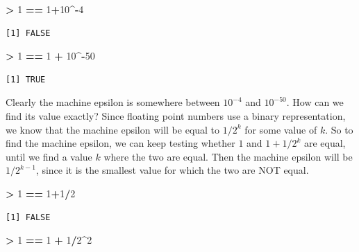 \documentclass[
]{krantz}
\makeatletter
\newenvironment{Shaded}{\begin{snugshade}}{\end{snugshade}}
\newcommand{\DecValTok}[1]{\textcolor[rgb]{0.06,0.06,0.06}{#1}}
\newcommand{\OperatorTok}[1]{\textcolor[rgb]{0.43,0.43,0.43}{\textbf{#1}}}
\newcommand{\StringTok}[1]{\textcolor[rgb]{0.5,0.5,0.5}{#1}}
\newenvironment{kframe}{%
\medskip{}
\setlength{\fboxsep}{.8em}
 \def\at@end@of@kframe{}%
 \ifinner\ifhmode%
  \def\at@end@of@kframe{\end{minipage}}%
  \begin{minipage}{\columnwidth}%
 \fi\fi%
 \def\FrameCommand##1{\hskip\@totalleftmargin \hskip-\fboxsep
 \colorbox{shadecolor}{##1}\hskip-\fboxsep
     \hskip-\linewidth \hskip-\@totalleftmargin \hskip\columnwidth}%
 \MakeFramed {\advance\hsize-\width
   \@totalleftmargin\z@ \linewidth\hsize
   \@setminipage}}%
 {\par\unskip\endMakeFramed%
 \at@end@of@kframe}
\renewenvironment{Shaded}{\begin{kframe}}{\end{kframe}}
\makeatother
\begin{document}
\begin{Shaded}
\begin{Highlighting}[]
\OperatorTok{\textgreater{}}\StringTok{ }\DecValTok{1} \OperatorTok{==}\StringTok{ }\DecValTok{1}\OperatorTok{+}\DecValTok{10}\OperatorTok{\^{}{-}}\DecValTok{4}
\end{Highlighting}
\end{Shaded}

\begin{verbatim}
[1] FALSE
\end{verbatim}

\begin{Shaded}
\begin{Highlighting}[]
\OperatorTok{\textgreater{}}\StringTok{ }\DecValTok{1} \OperatorTok{==}\StringTok{ }\DecValTok{1} \OperatorTok{+}\StringTok{ }\DecValTok{10}\OperatorTok{\^{}{-}}\DecValTok{50}
\end{Highlighting}
\end{Shaded}

\begin{verbatim}
[1] TRUE
\end{verbatim}

Clearly the machine epsilon is somewhere between \(10^{-4}\) and \(10^{-50}\). How can we find its value exactly? Since floating point numbers use a binary representation, we know that the machine epsilon will be equal to \(1/2^k\) for some value of \(k\). So to find the machine epsilon, we can keep testing whether \(1\) and \(1+1/2^k\) are equal, until we find a value \(k\) where the two are equal. Then the machine epsilon will be \(1/2^{k-1}\), since it is the smallest value for which the two are NOT equal.

\begin{Shaded}
\begin{Highlighting}[]
\OperatorTok{\textgreater{}}\StringTok{ }\DecValTok{1} \OperatorTok{==}\StringTok{ }\DecValTok{1}\OperatorTok{+}\DecValTok{1}\OperatorTok{/}\DecValTok{2}
\end{Highlighting}
\end{Shaded}

\begin{verbatim}
[1] FALSE
\end{verbatim}

\begin{Shaded}
\begin{Highlighting}[]
\OperatorTok{\textgreater{}}\StringTok{ }\DecValTok{1} \OperatorTok{==}\StringTok{ }\DecValTok{1} \OperatorTok{+}\StringTok{ }\DecValTok{1}\OperatorTok{/}\DecValTok{2}\OperatorTok{\^{}}\DecValTok{2}
\end{Highlighting}
\end{Shaded}
\end{document}
